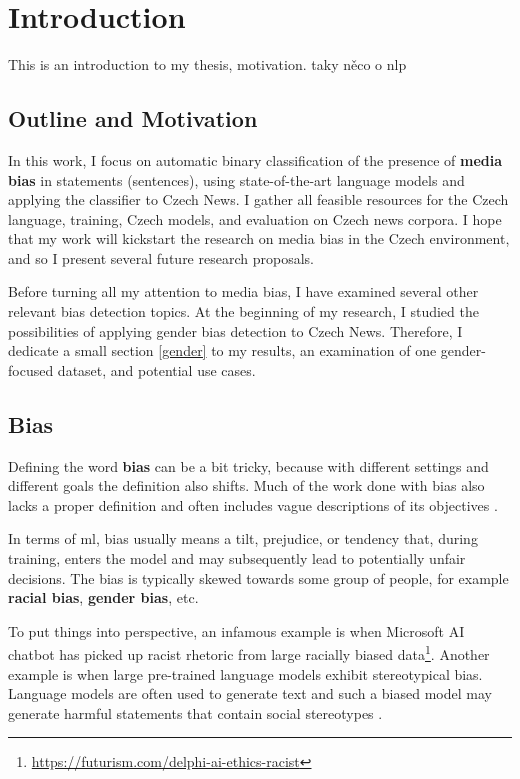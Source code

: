 \chapter{Introduction}
This is an introduction to my thesis, motivation. taky něco o nlp

\section{Outline and Motivation}
In this work, I focus on automatic binary classification of the presence of \textbf{media bias} in statements (sentences), using state-of-the-art language models and applying the classifier to Czech News. I gather all feasible resources for the Czech language, training, Czech models, and evaluation on Czech news corpora. I hope that my work will kickstart the research on media bias in the Czech environment, and so I present several future research proposals.

Before turning all my attention to media bias, I have examined several other relevant bias detection topics. At the beginning of my research, I studied the possibilities of applying gender bias detection to Czech News. Therefore, I dedicate a small section \ref{gender} to my results, an examination of one gender-focused dataset, and potential use cases.


\section{Bias}
Defining the word \textbf{bias} can be a bit tricky, because with different settings and different goals the definition also shifts. Much of the work done with bias also lacks a proper definition and often includes vague descriptions of its objectives \cite{blodgett2020language}. 

In terms of \Gls{ml}, bias usually means a tilt, prejudice, or tendency that, during training, enters the model and may subsequently lead to potentially unfair decisions. The bias is typically skewed towards some group of people, for example \textbf{racial bias}, \textbf{gender bias}, etc. 

To put things into perspective, an infamous example is when Microsoft AI chatbot has picked up racist rhetoric from large racially biased data\footnote{\url{https://futurism.com/delphi-ai-ethics-racist}}. Another example is when large pre-trained language models exhibit stereotypical bias. Language models are often used to generate text and such a biased model may generate harmful statements that contain social stereotypes \cite{nadeem2021stereoset}.

